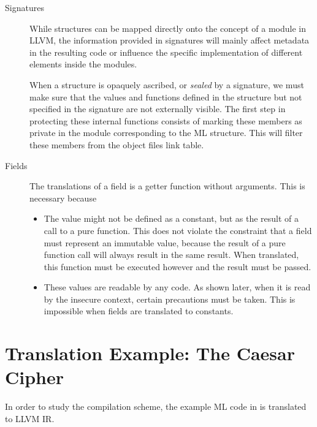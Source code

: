 \begin{description}
\item[Signatures]
While structures can be mapped directly onto the concept of a module in LLVM, the information provided in signatures will mainly affect metadata in the resulting code or influence the specific implementation of different elements inside the modules.

When a structure is opaquely ascribed, or \emph{sealed} by a signature, we must make sure that the values and functions defined in the structure but not specified in the signature are not externally visible. The first step in protecting these internal functions consists of marking these members as private in the module corresponding to the ML structure. This will filter these members from the object files link table. %


\item[Fields]
The translations of a field is a getter function without arguments.
This is necessary because \begin{itemize}
 \item The value might not be defined as a constant, but as the result of a call to a pure function.
 This does not violate the constraint that a field must represent an immutable value, because the result of a pure function call will always result in the same result. 
When translated, this function must be executed however and the result must be passed.
\item These values are readable by any code.
As shown later, when it is read by the insecure context, certain precautions must be taken.
This is impossible when fields are translated to constants.
 \end{itemize}


\end{description}

\section{Translation Example: The Caesar Cipher}
In order to study the compilation scheme, the example ML code in  is translated to LLVM IR.

